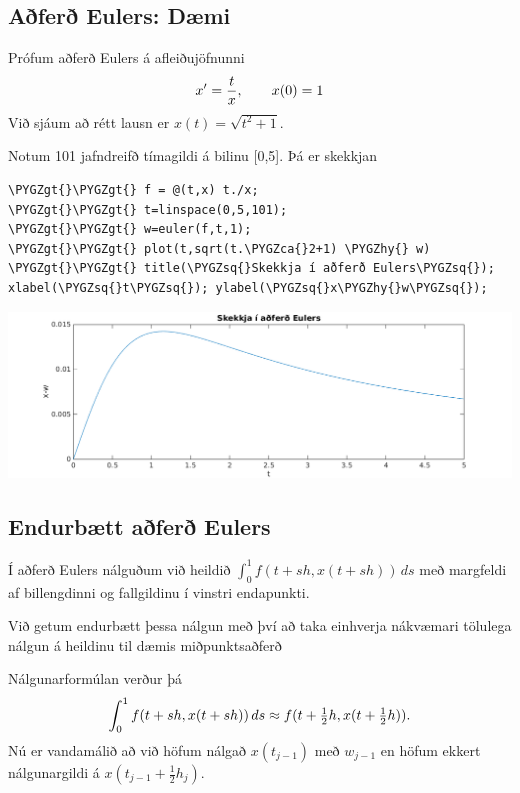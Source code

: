 \documentclass[letterpaper,10pt,icelandic]{sphinxmanual}
\def\PYGZca{\char`\^}
\def\PYGZgt{\char`\>}
\def\PYGZhy{\char`\-}
\def\PYGZsq{\char`\'}
\renewcommand\PYGZsq{\textquotesingle}
\begin{document}
\subsection{Aðferð Eulers: Dæmi}
\label{kafli06:afer-eulers-daemi}
Prófum aðferð Eulers á afleiðujöfnunni
\begin{gather}
\begin{split}x' = \frac tx, \qquad x(0) = 1\end{split}\notag
\end{gather}
Við sjáum að rétt lausn er \(x(t) = \sqrt{t^2+ 1}\).

Notum 101 jafndreifð tímagildi á bilinu {[}0,5{]}. Þá er skekkjan

\begin{Verbatim}[commandchars=\\\{\}]
\PYGZgt{}\PYGZgt{} f = @(t,x) t./x;
\PYGZgt{}\PYGZgt{} t=linspace(0,5,101);
\PYGZgt{}\PYGZgt{} w=euler(f,t,1);
\PYGZgt{}\PYGZgt{} plot(t,sqrt(t.\PYGZca{}2+1) \PYGZhy{} w)
\PYGZgt{}\PYGZgt{} title(\PYGZsq{}Skekkja í aðferð Eulers\PYGZsq{}); xlabel(\PYGZsq{}t\PYGZsq{}); ylabel(\PYGZsq{}x\PYGZhy{}w\PYGZsq{});
\end{Verbatim}

\includegraphics{7euler.png}


\subsection{Endurbætt aðferð Eulers}
\label{kafli06:endurbaett-afer-eulers}\label{kafli06:index-8}
Í aðferð Eulers nálguðum við heildið
\(\int_0^1 f(t+sh,x(t+sh))\, ds\) með margfeldi af billengdinni og
fallgildinu í vinstri endapunkti.

Við getum endurbætt þessa nálgun með því að taka einhverja nákvæmari
tölulega nálgun á heildinu til dæmis miðpunktsaðferð

Nálgunarformúlan verður þá
\begin{gather}
\begin{split}\int_0^1f(t+sh,x(t+sh))\, ds \approx f(t+\tfrac 12h,x(t+\tfrac 12 h)).\end{split}\notag
\end{gather}
Nú er vandamálið að við höfum nálgað \(x(t_{j-1})\) með
\(w_{j-1}\) en höfum ekkert nálgunargildi á
\(x(t_{j-1}+\frac 12 h_j)\).
\end{document}
